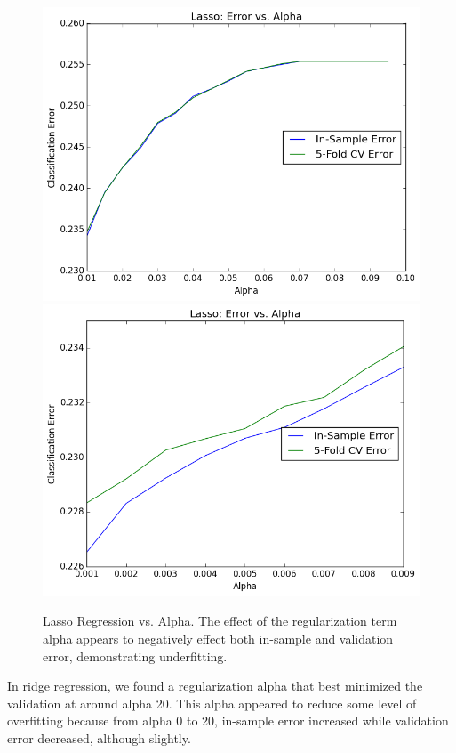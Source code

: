 \begin{itemize}
\begin{itemize}
\begin{figure}[H]
\centering
\includegraphics[scale=0.35]{lasso-vs-alpha2}
\includegraphics[scale=0.35]{lasso-vs-alpha}
\caption{Lasso Regression vs. Alpha. The effect of the regularization term alpha appears to negatively effect both in-sample and validation error, demonstrating underfitting.}
\end{figure}
In ridge regression, we found a regularization alpha that best minimized the validation at around alpha 20. This alpha appeared to reduce some level of overfitting because from alpha 0 to 20, in-sample error increased  while validation error decreased, although slightly.
\begin{figure}[H]

\end{figure}
\end{itemize}
\end{itemize}
